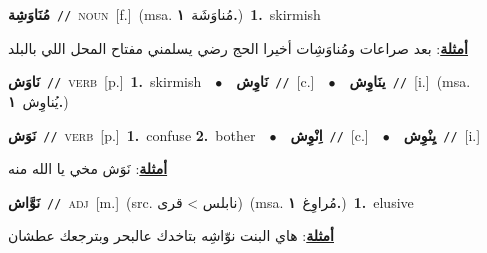 \documentclass[10pt,a4paper,twoside]{article} %
\begin{document}
\begin{multicols}{2}
{\setlength\topsep{0pt}\textbf{\foreignlanguage{arabic}{مُنَاوَشِة}}\ {\color{gray}\texttt{//}\color{black}}\ \textsc{noun}\ [f.]\ \color{gray}(msa. \foreignlanguage{arabic}{مُناوَشَة}~\foreignlanguage{arabic}{\textbf{١.}})\color{black}\ \textbf{1.}~skirmish\  \begin{flushright}\color{gray}\foreignlanguage{arabic}{\textbf{\underline{\foreignlanguage{arabic}{أمثلة}}}: بعد صراعات ومُناوَشِات أخيرا الحج رضي يسلمني مفتاح المحل اللي بالبلد}\end{flushright}\color{black}} \vspace{2mm}

{\setlength\topsep{0pt}\textbf{\foreignlanguage{arabic}{نَاوَش}}\ {\color{gray}\texttt{//}\color{black}}\ \textsc{verb}\ [p.]\ \textbf{1.}~skirmish\ \ $\bullet$\ \ \setlength\topsep{0pt}\textbf{\foreignlanguage{arabic}{نَاوِش}}\ {\color{gray}\texttt{//}\color{black}}\ [c.]\ \ $\bullet$\ \ \setlength\topsep{0pt}\textbf{\foreignlanguage{arabic}{ينَاوِش}}\ {\color{gray}\texttt{//}\color{black}}\ [i.]\ \color{gray}(msa. \foreignlanguage{arabic}{يُناوِش}~\foreignlanguage{arabic}{\textbf{١.}})\color{black}\ } \vspace{2mm}

{\setlength\topsep{0pt}\textbf{\foreignlanguage{arabic}{نَوَش}}\ {\color{gray}\texttt{//}\color{black}}\ \textsc{verb}\ [p.]\ \textbf{1.}~confuse  \textbf{2.}~bother\ \ $\bullet$\ \ \setlength\topsep{0pt}\textbf{\foreignlanguage{arabic}{اِنْوِش}}\ {\color{gray}\texttt{//}\color{black}}\ [c.]\ \ $\bullet$\ \ \setlength\topsep{0pt}\textbf{\foreignlanguage{arabic}{يِنْوِش}}\ {\color{gray}\texttt{//}\color{black}}\ [i.]\  \begin{flushright}\color{gray}\foreignlanguage{arabic}{\textbf{\underline{\foreignlanguage{arabic}{أمثلة}}}: نَوَش مخي يا الله منه}\end{flushright}\color{black}} \vspace{2mm}

{\setlength\topsep{0pt}\textbf{\foreignlanguage{arabic}{نَوَّاش}}\ {\color{gray}\texttt{//}\color{black}}\ \textsc{adj}\ [m.]\ (src. \color{gray}\foreignlanguage{arabic}{نابلس > قرى}\color{black})\ \color{gray}(msa. \foreignlanguage{arabic}{مُراوِغ}~\foreignlanguage{arabic}{\textbf{١.}})\color{black}\ \textbf{1.}~elusive\  \begin{flushright}\color{gray}\foreignlanguage{arabic}{\textbf{\underline{\foreignlanguage{arabic}{أمثلة}}}: هاي البنت نوّاشِه بتاخدك عالبحر وبترجعك عطشان}\end{flushright}\color{black}} \vspace{2mm}


\end{multicols}
\end{document}
